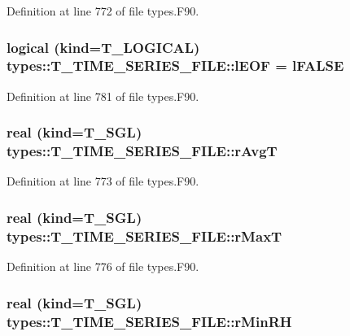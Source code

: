 Definition at line 772 of file types.F90.

\hypertarget{typetypes_1_1_t___t_i_m_e___s_e_r_i_e_s___f_i_l_e_ad0606fdb5ca56ba355b0c1cf330ebc01}{
\subsubsection[{lEOF}]{\setlength{\rightskip}{0pt plus 5cm}logical (kind={\bf T\_\-LOGICAL}) {\bf types::T\_\-TIME\_\-SERIES\_\-FILE::lEOF} = {\bf lFALSE}}}
\label{typetypes_1_1_t___t_i_m_e___s_e_r_i_e_s___f_i_l_e_ad0606fdb5ca56ba355b0c1cf330ebc01}


Definition at line 781 of file types.F90.

\hypertarget{typetypes_1_1_t___t_i_m_e___s_e_r_i_e_s___f_i_l_e_a386078faad825436d231a04add5769c3}{
\subsubsection[{rAvgT}]{\setlength{\rightskip}{0pt plus 5cm}real (kind={\bf T\_\-SGL}) {\bf types::T\_\-TIME\_\-SERIES\_\-FILE::rAvgT}}}
\label{typetypes_1_1_t___t_i_m_e___s_e_r_i_e_s___f_i_l_e_a386078faad825436d231a04add5769c3}


Definition at line 773 of file types.F90.

\hypertarget{typetypes_1_1_t___t_i_m_e___s_e_r_i_e_s___f_i_l_e_af3573ccce95c5fd28c61add243b8dea7}{
\subsubsection[{rMaxT}]{\setlength{\rightskip}{0pt plus 5cm}real (kind={\bf T\_\-SGL}) {\bf types::T\_\-TIME\_\-SERIES\_\-FILE::rMaxT}}}
\label{typetypes_1_1_t___t_i_m_e___s_e_r_i_e_s___f_i_l_e_af3573ccce95c5fd28c61add243b8dea7}


Definition at line 776 of file types.F90.

\hypertarget{typetypes_1_1_t___t_i_m_e___s_e_r_i_e_s___f_i_l_e_a0091cf1767332353442f89528c6b47ac}{
\subsubsection[{rMinRH}]{\setlength{\rightskip}{0pt plus 5cm}real (kind={\bf T\_\-SGL}) {\bf types::T\_\-TIME\_\-SERIES\_\-FILE::rMinRH}}}
\label{typetypes_1_1_t___t_i_m_e___s_e_r_i_e_s___f_i_l_e_a0091cf1767332353442f89528c6b47ac}


